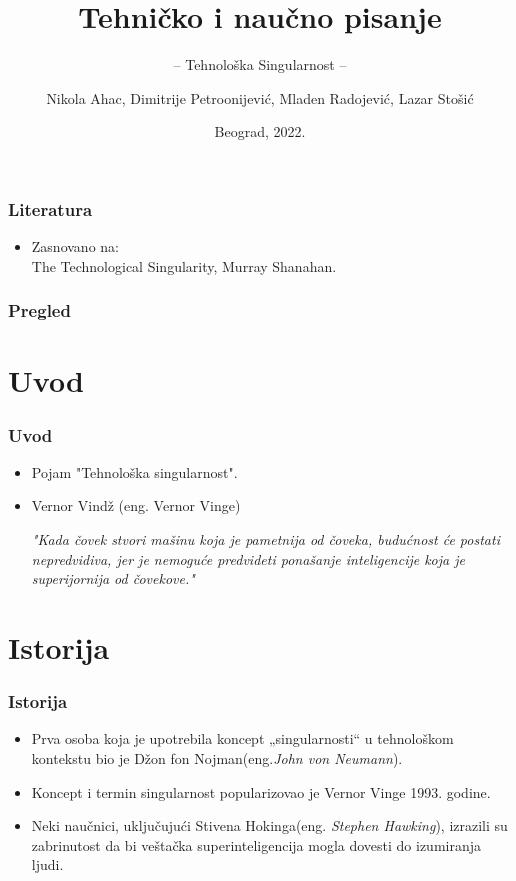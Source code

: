 \documentclass{beamer}
\title{Tehničko i naučno pisanje}
\subtitle{-- Tehnološka Singularnost --}
\author{Nikola Ahac, Dimitrije Petroonijević, Mladen Radojević, Lazar Stošić}
\institute{Matematički fakultet\\Univerzitet u Beogradu}
\date{
	\footnotesize{Beograd, 2022.}	
}
\begin{document}
\begin{frame}
	\thispagestyle{empty}
	\titlepage
\end{frame}

\addtocounter{framenumber}{-1}

\begin{frame}[fragile]\frametitle{Literatura}
	\begin{itemize}
		\item Zasnovano na:\\
		The Technological Singularity, Murray Shanahan.
	\end{itemize}
\end{frame}

\begin{frame}
	\frametitle{Pregled} %
	\tableofcontents[hidesubsections] 
\end{frame}
\section{Uvod}

\begin{frame}[fragile]\frametitle{Uvod}
	\begin{itemize}	
		\item Pojam "Tehnološka singularnost".
		\item Vernor Vindž (eng. Vernor Vinge)
              
              \textit {"Kada čovek stvori mašinu koja je pametnija od čoveka, budućnost će postati nepredvidiva, jer je nemoguće predvideti ponašanje inteligencije koja je superijornija od čovekove."}

	\end{itemize}
\end{frame}

\section{Istorija}
\begin{frame}[fragile]\frametitle{Istorija}
    \begin{itemize}	
        \item Prva osoba koja je upotrebila koncept „singularnosti“ u tehnološkom kontekstu bio je Džon fon Nojman(eng.\textit{John von Neumann}).
        \item Koncept i termin singularnost popularizovao je Vernor Vinge 1993. godine.
	 \item Neki naučnici, uključujući Stivena Hokinga(eng. \textit{Stephen Hawking}), izrazili su zabrinutost da bi veštačka superinteligencija mogla dovesti do izumiranja ljudi.
    \end{itemize}
\end{frame}
\end{document}
